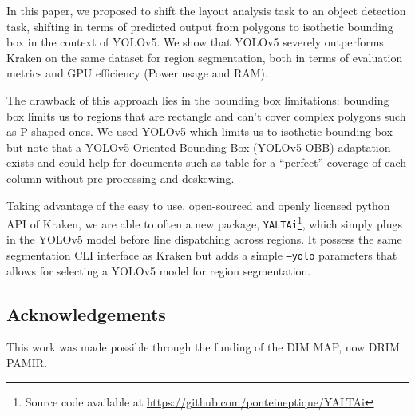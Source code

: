 \documentclass{jdmdh}
\begin{document}
In this paper, we proposed to shift the layout analysis task to an object detection task, shifting in terms of predicted output from polygons to isothetic bounding box in the context of YOLOv5. We show that YOLOv5 severely outperforms Kraken on the same dataset for region segmentation, both in terms of evaluation metrics and GPU efficiency (Power usage and RAM).

The drawback of this approach lies in the bounding box limitations: bounding box limits us to regions that are rectangle and can't cover complex polygons such as P-shaped ones. We used YOLOv5 which limits us to isothetic bounding box but note that a YOLOv5 Oriented Bounding Box (YOLOv5-OBB) adaptation exists and could help for documents such as table for a ``perfect'' coverage of each column without pre-processing and deskewing.

Taking advantage of the easy to use, open-sourced and openly licensed python API of Kraken, we are able to often a new package, \texttt{YALTAi}\footnote{Source code available at \url{https://github.com/ponteineptique/YALTAi}}, which simply plugs in the YOLOv5 model before line dispatching across regions. It possess the same segmentation CLI interface as Kraken but adds a simple \texttt{--yolo} parameters that allows for selecting a YOLOv5 model for region segmentation.

\subsection{Acknowledgements}

This work was made possible through the funding of the DIM MAP, now DRIM PAMIR.



\end{document}
